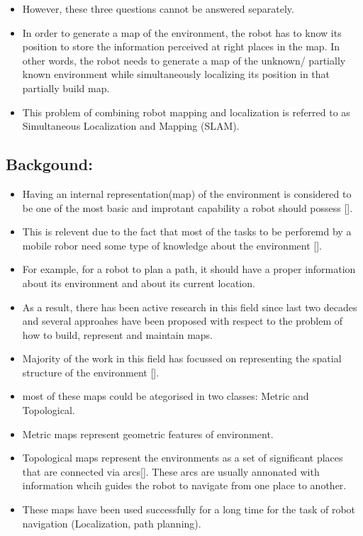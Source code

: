 \begin{itemize}
 \item However, these three questions cannot be answered separately. 
 \item In order to generate a map of the environment, the robot has to know its position to store the information perceived at right places in the map. In other words, the robot needs to generate a map of the unknown/ partially known 
environment while simultaneously localizing its position in that partially build map. 
 \item This problem of combining robot mapping and localization is referred to as Simultaneous Localization and Mapping (SLAM).\\
\end{itemize} 

\subsection{Backgound:}
\begin{itemize}
 \item Having an internal representation(map) of the environment is considered to be one of the most basic and improtant capability a robot should possess [].
 \item This is relevent due to the fact that most of the tasks to be perforemd by a mobile robor need some type of knowledge about the environment [].
 \item For example, for a robot to plan a path, it should have a proper information about its environment and about its current location.
 \item As a result, there has been active research in this field since last two decades and several approahes have been proposed with respect to the problem of how to build, represent and maintain maps.
 \item Majority of the work in this field has focussed on representing the spatial structure of the environment [].\\
 \item most of these maps could be ategorised in two classes: Metric and Topological.\\
 \item Metric maps represent geometric features of environment.\
 \item Topological maps represent the environments as a set of significant places that are connected via arcs[]. These arcs are usually annonated with information whcih guides the robot to navigate from one place to another. 
 \item These maps have been used successfully for a long time for the task of robot navigation (Localization, path planning).
\end{itemize}

